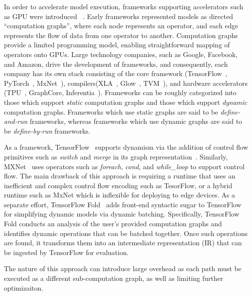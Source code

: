In order to accelerate model execution,
    frameworks supporting accelerators such as GPU were introduced~\citep{theano} .
Early frameworks represented models as directed ``computation graphs'',
    where each node represents an operator,
    and each edge represents the flow of data from one operator to another.
Computation graphs provide a limited programming model,
    enabling straightforward mapping of operators onto GPUs.
Large technology companies,
    such as Google, Facebook, and Amazon,
    drive the development of frameworks,
    and consequently,
    each company has its own stack consisting
    of the core framework (TensorFlow~\citep{tensorflow}, PyTorch~\citep{pytorch}, MxNet~\citep{mxnet}),
    compilers(XLA~\citep{xla}, Glow~\citep{glow}, TVM~\citep{tvm_osdi18}),
    and hardware accelerators (TPU~\citep{tpuv1}, GraphCore, Inferentia~\citep{inferentia}).
Frameworks can be roughly categorized into those which support \textit{static} computation graphs
  and those which support \textit{dynamic} computation graphs.
Frameworks which use static graphs are said to be \textit{define-and-run} frameworks,
  whereas frameworks which use dynamic graphs are said to be \textit{define-by-run} frameworks.

As a framework, TensorFlow~\citep{tensorflow} supports dynamism via the addition
of control flow primitives such as \emph{switch} and \emph{merge} in its graph
representation~\citep{yu2018dynamic}. Similarly, MXNet~\citep{mxnet, mxnet-control}
uses operators such as {\em foreach}, {\em cond}, and {\em while\_loop} to support control flow.
  The main drawback of this approach is requiring a runtime that uses an inefficient and complex
  control flow encoding such as TesorFlow, or a hybrid runtime such as MxNet which is inflexible
  for deploying to edge devices.
As a separate effort, TensorFlow Fold~\citep{tensorflowfold} adds front-end
  syntactic sugar to TensorFlow for simplifying dynamic models via dynamic batching.
Specifically, TensorFlow Fold conducts an analysis of the user's provided computation
  graphs and identifies dynamic operations that can be batched together. Once such operations
  are found, it transforms them into an intermediate representation (IR) that can be
  ingested by TensorFlow for evaluation.

The nature of this approach can introduce large overhead as each path must
  be executed as a different sub-computation graph, as well as limiting further optimizaiton.

